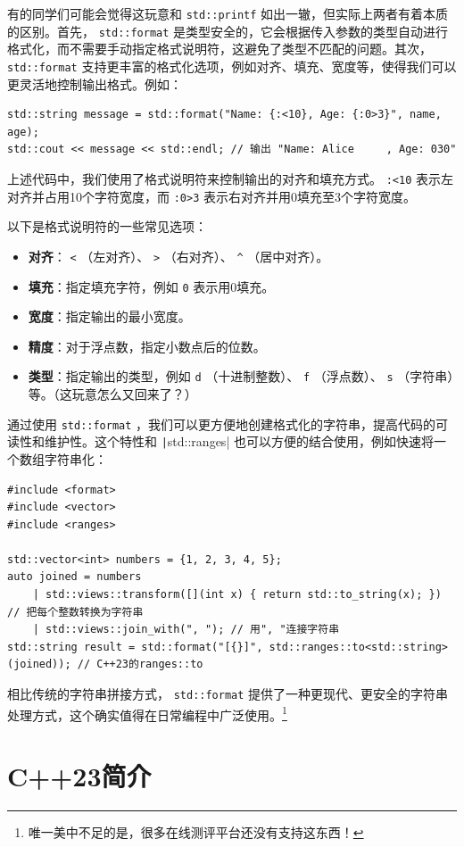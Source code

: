 有的同学们可能会觉得这玩意和 \verb|std::printf| 如出一辙，但实际上两者有着本质的区别。首先， \verb|std::format| 是类型安全的，它会根据传入参数的类型自动进行格式化，而不需要手动指定格式说明符，这避免了类型不匹配的问题。其次， \verb|std::format| 支持更丰富的格式化选项，例如对齐、填充、宽度等，使得我们可以更灵活地控制输出格式。例如：
\begin{verbatim}
std::string message = std::format("Name: {:<10}, Age: {:0>3}", name, age);
std::cout << message << std::endl; // 输出 "Name: Alice     , Age: 030"
\end{verbatim}
上述代码中，我们使用了格式说明符来控制输出的对齐和填充方式。 \verb|:<10| 表示左对齐并占用10个字符宽度，而 \verb|:0>3| 表示右对齐并用0填充至3个字符宽度。

以下是格式说明符的一些常见选项：
\begin{itemize}
    \item \textbf{对齐}： \verb|<| （左对齐）、 \verb|>| （右对齐）、 \verb|^| （居中对齐）。
    \item \textbf{填充}：指定填充字符，例如 \verb|0| 表示用0填充。
    \item \textbf{宽度}：指定输出的最小宽度。
    \item \textbf{精度}：对于浮点数，指定小数点后的位数。
    \item \textbf{类型}：指定输出的类型，例如 \verb|d| （十进制整数）、 \verb|f| （浮点数）、 \verb|s| （字符串）等。（这玩意怎么又回来了？）
\end{itemize}

通过使用 \verb|std::format| ，我们可以更方便地创建格式化的字符串，提高代码的可读性和维护性。这个特性和 \texttt|std::ranges| 也可以方便的结合使用，例如快速将一个数组字符串化：
\begin{verbatim}
#include <format>
#include <vector>
#include <ranges>

std::vector<int> numbers = {1, 2, 3, 4, 5};
auto joined = numbers 
    | std::views::transform([](int x) { return std::to_string(x); }) // 把每个整数转换为字符串
    | std::views::join_with(", "); // 用", "连接字符串
std::string result = std::format("[{}]", std::ranges::to<std::string>(joined)); // C++23的ranges::to
\end{verbatim}

相比传统的字符串拼接方式， \verb|std::format| 提供了一种更现代、更安全的字符串处理方式，这个确实值得在日常编程中广泛使用。\footnote{唯一美中不足的是，很多在线测评平台还没有支持这东西！}

\section{C++23简介}

